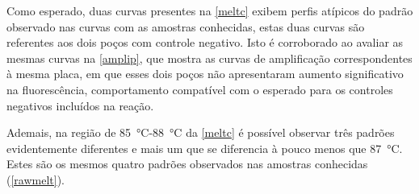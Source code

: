 Como esperado, duas curvas presentes na \cref{meltc} exibem perfis atípicos do
padrão observado nas curvas com as amostras conhecidas, estas duas curvas são
referentes aos dois poços com controle negativo. Isto é corroborado ao avaliar
as mesmas curvas na \cref{amplip}, que mostra as curvas de amplificação
correspondentes à mesma placa, em que esses dois poços não apresentaram aumento
significativo na fluorescência, comportamento compatível com o esperado para os controles negativos incluídos na reação.

Ademais, na região de \qty{85}{\celsius}-\qty{88}{\celsius} da \cref{meltc} é
possível observar três padrões evidentemente diferentes e mais um que se
diferencia à pouco menos que \qty{87}{\celsius}. Estes são os mesmos quatro
padrões observados nas amostras conhecidas (\cref{rawmelt}).

